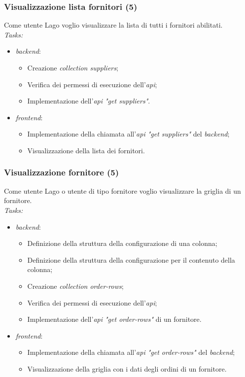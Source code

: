 \subsubsection{Visualizzazione lista fornitori (5)}
Come utente Lago voglio visualizzare la lista di tutti i fornitori abilitati. \\
\emph{Tasks:}
\begin{itemize}
  \item \emph{\gls{backend}}:
    \begin{itemize}
      \item Creazione \emph{collection suppliers};
      \item Verifica dei permessi di esecuzione dell'\emph{\acrshort{api}};
      \item Implementazione dell'\emph{\acrshort{api} "get suppliers"}.
    \end{itemize}
  \item \emph{\gls{frontend}}:
    \begin{itemize}
      \item Implementazione della chiamata all'\emph{\acrshort{api} "get suppliers"} del \emph{\gls{backend}};
      \item Visualizzazione della lista dei fornitori.
    \end{itemize}
\end{itemize}

\subsubsection{Visualizzazione fornitore (5)}
Come utente Lago o utente di tipo fornitore voglio visualizzare la griglia di un fornitore. \\
\emph{Tasks:}
\begin{itemize}
  \item \emph{\gls{backend}}:
    \begin{itemize}
      \item Definizione della struttura della configurazione di una colonna;
      \item Definizione della struttura della configurazione per il contenuto della colonna;
      \item Creazione \emph{collection order-rows};
      \item Verifica dei permessi di esecuzione dell'\emph{\acrshort{api}};
      \item Implementazione dell'\emph{\acrshort{api} "get order-rows"} di un fornitore.
    \end{itemize}
  \item \emph{\gls{frontend}}:
    \begin{itemize}
      \item Implementazione della chiamata all'\emph{\acrshort{api} "get order-rows"} del \emph{\gls{backend}};
      \item Visualizzazione della griglia con i dati degli ordini di un fornitore.
    \end{itemize}
\end{itemize}

